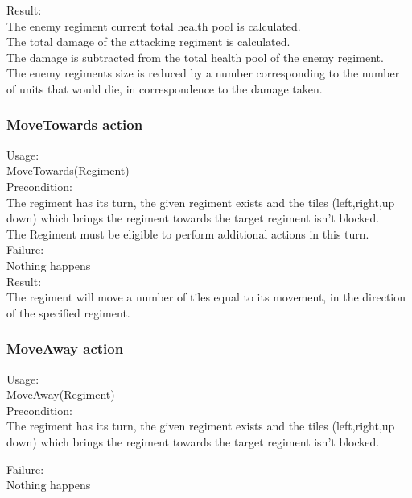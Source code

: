 		Result: \\
		The enemy regiment current total health pool is calculated.\\ 
		The total damage of the attacking regiment is calculated. \\
		The damage is subtracted from the total health pool of the enemy regiment.\\
		The enemy regiments size is reduced by a number corresponding to the number of units that would die, in correspondence to the damage taken.\\
		
		\subsubsection{MoveTowards action}
		Usage: \\
		MoveTowards(Regiment) \\
		
		Precondition: \\
		The regiment has its turn, the given regiment exists and the tiles (left,right,up down) 
		which brings the regiment towards the target regiment isn't blocked.\\
		The Regiment must be eligible to perform additional actions in this turn.\\
		
		Failure: \\
		Nothing happens \\
		
		Result: \\
		The regiment will move a number of tiles equal to its movement, in the direction of the specified regiment.
		
		\subsubsection{MoveAway action}
		Usage: \\
		MoveAway(Regiment) \\
		
		Precondition: \\
		The regiment has its turn, the given regiment exists and the tiles (left,right,up down) 
		which brings the regiment towards the target regiment isn't blocked.
		
		Failure: \\
		Nothing happens \\
		
